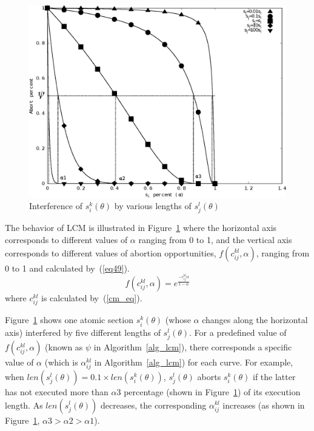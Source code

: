\documentclass[conference]{IEEEtran}
\begin{document}
%
\begin{figure}[htbp]
\centering
\includegraphics[scale=0.4]{figures/figure16}
\caption{\label{fig16}Interference of $s_{i}^{k}(\theta)$ by various lengths of 
$s_{j}^{l}(\theta)$}
\end{figure}

The behavior of LCM is illustrated in Figure~\ref{fig16} where the horizontal axis corresponds to different values of $\alpha$ ranging from 0 to 1, and the vertical axis corresponds to different values of abortion opportunities, $f(c_{ij}^{kl},\alpha)$, ranging from 0 to 1 and calculated by~(\ref{eq49}).
\begin{equation}
f(c_{ij}^{kl},\alpha)=e^{\frac{-c_{ij}^{kl}\alpha}{1-\alpha}}
\label{eq49}\end{equation}
where $c_{ij}^{kl}$ is calculated by~(\ref{cm_eq}).

Figure~\ref{fig16} shows one atomic section $s_i^k(\theta)$ (whose $\alpha$ changes along the horizontal axis) interfered by five different lengths of $s_j^l(\theta)$.
For a predefined value of $f(c_{ij}^{kl},\alpha)$ (known as $\psi$ in Algorithm~\ref{alg_lcm}), there corresponds a specific value of $\alpha$ (which is $\alpha_{ij}^{kl}$ in Algorithm~\ref{alg_lcm}) for each curve. For example, when $len(s_j^l(\theta))=0.1 \times len(s_i^k(\theta))$, $s_j^l(\theta)$ aborts $s_i^k(\theta)$ if the latter has not executed more than $\alpha3$ percentage (shown in Figure~\ref{fig16}) of its execution length.
As $len(s_{j}^{l}(\theta))$ decreases, the corresponding $\alpha_{ij}^{kl}$ increases (as shown in Figure~\ref{fig16}, $\alpha3>\alpha2>\alpha1$).
\end{document}
